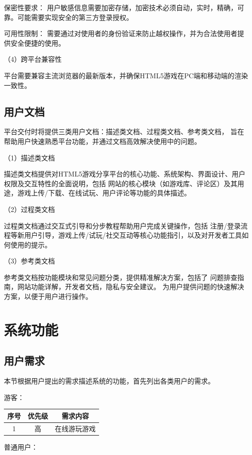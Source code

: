 \documentclass[12pt]{ctexart} %
\begin{document}
保密性要求：
用户敏感信息需要加密存储，加密技术必须自动，实时，精确，可靠。可能需要实现安全的第三方登录授权。

可用性限制：
需要通过对使用者的身份验证来防止越权操作，并为合法使用者提供安全便捷的使用。

（4）跨平台兼容性

平台需要兼容主流浏览器的最新版本，并确保HTML5游戏在PC端和移动端的渲染一致性。



\subsection{用户文档}
平台交付时将提供三类用户文档：描述类文档、过程类文档、参考类文档，
旨在帮助用户快速熟悉平台功能，并通过文档高效解决使用中的问题。

（1）描述类文档

描述类文档提供对HTML5游戏分享平台的核心功能、系统架构、界面设计、用户权限及交互特性的全面说明，包括
网站的核心模块（如游戏库、评论区）及其用途，游戏上传/下载、在线试玩、用户评论等功能的具体描述。

（2）过程类文档

过程类文档通过交互式引导和分步教程帮助用户完成关键操作，包括
注册/登录流程等新用户引导，游戏上传/试玩/社交互动等核心功能指引，以及对开发者工具如何使用的提示。

（3）参考类文档

参考类文档按功能模块和常见问题分类，提供精准解决方案，包括了
问题排查指南，网站功能详解，开发者文档，隐私与安全建议。
为用户提供问题的快速解决方案，以便于用户进行操作。


\section{系统功能}
\subsection{用户需求}
本节根据用户提出的需求描述系统的功能，首先列出各类用户的需求。

游客：

\begin{tabular}{|c|c|c|}
  \hline
  序号& 优先级& 需求内容\\
  \hline
  1 & 高& 在线游玩游戏\\
  \hline
\end{tabular}

\vspace{1cm}
普通用户：
\end{document}
